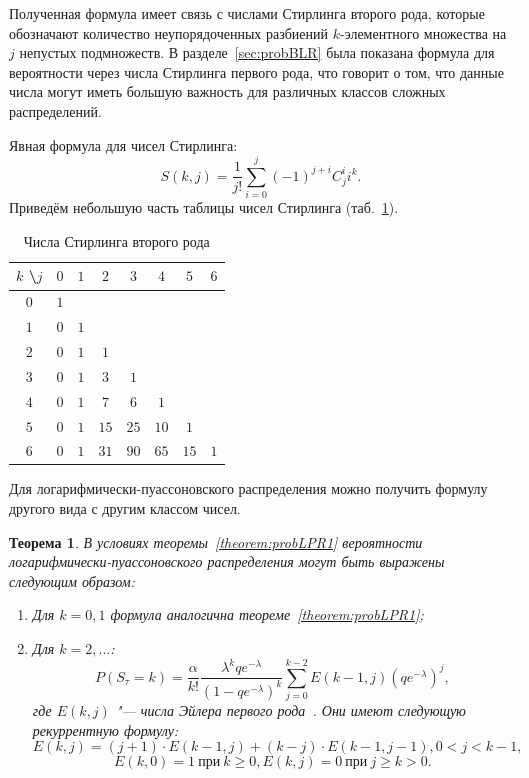 \documentclass[12pt, specialist, subf, substylefile = spbu.rtx]{disser}
\newtheorem{theorem}{Теорема}
\begin{document}
	Полученная формула имеет связь с числами Стирлинга второго рода, которые обозначают количество неупорядоченных разбиений $k$-элементного множества на $j$ непустых подмножеств. В разделе~\ref{sec:probBLR} была показана формула для вероятности через числа Стирлинга первого рода, что говорит о том, что данные числа могут иметь большую важность для различных классов сложных распределений. 
	
	Явная формула для чисел Стирлинга:
	\[
	S(k, j) = \frac {1} {j!} \sum \limits _{i = 0} ^j (-1) ^{j + i} C _{j} ^{i} i ^k.
	\]
	Приведём небольшую часть таблицы чисел Стирлинга (таб.~\ref{tab:stirling2}).
	\begin{table}[!h]
		\centering
		\caption{Числа Стирлинга второго рода}
		\begin{tabular}{c|ccccccc}
			$k$ \textbackslash $j$ & $0$ & $1$ & $2$ & $3$ & $4$ & $5$ & $6$\\ \hline
			$0$ & $1$ &   &  &  & &  &\\
			$1$ & $0$ & $1$ &  &  & &  &\\
			$2$ & $0$ & $1$ & $1$ &  & &  &\\
			$3$ & $0$ & $1$ & $3$ & $1$ &  & &\\
			$4$ & $0$ & $1$ & $7$ &  $6$ & $1$ & & \\
			$5$ & $0$ & $1$ & $15$ & $25$ & $10$ & $1$ & \\
			$6$ & $0$ & $1$ & $31$ & $90$ & $65$ & $15$ & $1$
		\end{tabular}
		\label{tab:stirling2}
	\end{table}
	
	Для логарифмически-пуассоновского распределения можно получить формулу другого вида с другим классом чисел.
	
	\begin{theorem}
		\label{theorem:probLPR2}
		В условиях теоремы~\ref{theorem:probLPR1} вероятности логарифмически-пуассоновского распределения могут быть выражены следующим образом:
		\begin{enumerate}
			\item Для $k = 0, 1$ формула аналогична теореме~\ref{theorem:probLPR1};
			
			\item Для $k = 2, ...$:
			\[
				P(S _\tau = k) = \frac \alpha {k !} \frac {\lambda ^k q e ^{-\lambda}} {\left(1 - q e ^{-\lambda}\right) ^k} \sum \limits _{j = 0} ^{k - 2} E(k - 1, j) \left(q e ^{-\lambda}\right) ^j, 
			\]
			где $E(k, j)$ "--- числа Эйлера первого рода~\cite{bib:knuth1998}. Они имеют следующую рекуррентную формулу:
			\[
				E(k, j) = (j + 1) \cdot E(k - 1, j) + (k - j) \cdot E(k - 1, j - 1), 0 < j < k - 1,
			\]
			\[
				E(k, 0) = 1~ \text{при}~ k \geqslant 0, E(k, j) = 0~ \text{при}~ j \geqslant k > 0.
			\]
		\end{enumerate}
	\end{theorem}
	
\end{document}
